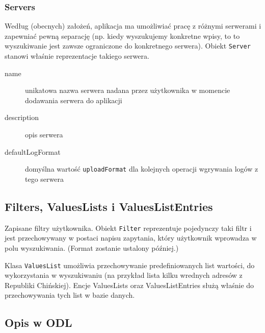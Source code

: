 \documentclass[a4paper, 10pt]{article}
\begin{document}
    \subsubsection{Servers}
    Według (obecnych) założeń, aplikacja ma umożliwiać pracę z różnymi serwerami i zapewniać pewną separację (np. kiedy wyszukujemy konkretne wpisy, to to wyszukiwanie jest zawsze ograniczone do konkretnego serwera). Obiekt \texttt{Server} stanowi właśnie reprezentacje takiego serwera.
    
    \begin{description}
        \item[name] unikatowa nazwa serwera nadana przez użytkownika w momencie dodawania serwera do aplikacji
        \item[description] opis serwera
        \item[defaultLogFormat] domyślna wartość \texttt{uploadFormat} dla kolejnych operacji wgrywania logów z tego serwera
    \end{description}
    
    \subsection{Filters, ValuesLists i ValuesListEntries}
    Zapisane filtry użytkownika. Obiekt \texttt{Filter} reprezentuje pojedynczy taki filtr i jest przechowywany w postaci napisu zapytania, który użytkownik wprowadza w polu wyszukiwania. (Format zostanie ustalony później.)
    
    Klasa \texttt{ValuesList} umożliwia przechowywanie predefiniowanych list wartości, do wykorzystania w wyszukiwaniu (na przykład lista kilku wrednych adresów z Republiki Chińskiej). Encje ValuesLists oraz ValuesListEntries służą właśnie do przechowywania tych list w bazie danych.
    
    \subsection{Opis w ODL}
    
\end{document}
